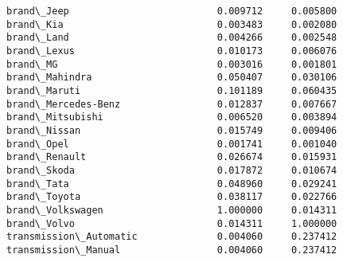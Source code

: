 \documentclass[11pt]{article}
\begin{document}
\begin{tcolorbox}[breakable, size=fbox, boxrule=.5pt, pad at break*=1mm, opacityfill=0]
\begin{Verbatim}[commandchars=\\\{\}]
brand\_Jeep                          0.009712     0.005800
brand\_Kia                           0.003483     0.002080
brand\_Land                          0.004266     0.002548
brand\_Lexus                         0.010173     0.006076
brand\_MG                            0.003016     0.001801
brand\_Mahindra                      0.050407     0.030106
brand\_Maruti                        0.101189     0.060435
brand\_Mercedes-Benz                 0.012837     0.007667
brand\_Mitsubishi                    0.006520     0.003894
brand\_Nissan                        0.015749     0.009406
brand\_Opel                          0.001741     0.001040
brand\_Renault                       0.026674     0.015931
brand\_Skoda                         0.017872     0.010674
brand\_Tata                          0.048960     0.029241
brand\_Toyota                        0.038117     0.022766
brand\_Volkswagen                    1.000000     0.014311
brand\_Volvo                         0.014311     1.000000
transmission\_Automatic              0.004060     0.237412
transmission\_Manual                 0.004060     0.237412


\end{Verbatim}
\end{tcolorbox}
\end{document}
